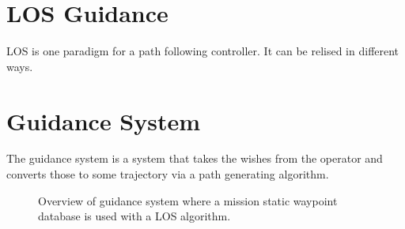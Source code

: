 \section{\acs{LOS} Guidance}
\acl{LOS} is one paradigm for a path following controller. It can be relised in different ways.

\section{Guidance System}
The guidance system is a system that takes the wishes from the
operator and converts those to some trajectory via a path generating
algorithm.


\begin{figure}[htbp]
	\centering
	
	\caption{Overview of guidance system where a mission static waypoint
	database is used with a \ac{LOS} algorithm.}
\end{figure}
